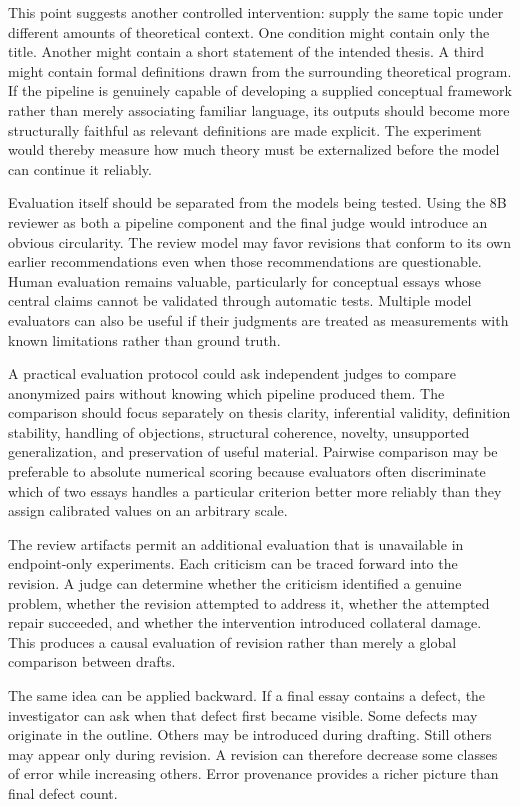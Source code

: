 \documentclass[11pt]{article}
\begin{document}
This point suggests another controlled intervention: supply the same topic under different amounts of theoretical context. One condition might contain only the title. Another might contain a short statement of the intended thesis. A third might contain formal definitions drawn from the surrounding theoretical program. If the pipeline is genuinely capable of developing a supplied conceptual framework rather than merely associating familiar language, its outputs should become more structurally faithful as relevant definitions are made explicit. The experiment would thereby measure how much theory must be externalized before the model can continue it reliably.

Evaluation itself should be separated from the models being tested. Using the 8B reviewer as both a pipeline component and the final judge would introduce an obvious circularity. The review model may favor revisions that conform to its own earlier recommendations even when those recommendations are questionable. Human evaluation remains valuable, particularly for conceptual essays whose central claims cannot be validated through automatic tests. Multiple model evaluators can also be useful if their judgments are treated as measurements with known limitations rather than ground truth.

A practical evaluation protocol could ask independent judges to compare anonymized pairs without knowing which pipeline produced them. The comparison should focus separately on thesis clarity, inferential validity, definition stability, handling of objections, structural coherence, novelty, unsupported generalization, and preservation of useful material. Pairwise comparison may be preferable to absolute numerical scoring because evaluators often discriminate which of two essays handles a particular criterion better more reliably than they assign calibrated values on an arbitrary scale.

The review artifacts permit an additional evaluation that is unavailable in endpoint-only experiments. Each criticism can be traced forward into the revision. A judge can determine whether the criticism identified a genuine problem, whether the revision attempted to address it, whether the attempted repair succeeded, and whether the intervention introduced collateral damage. This produces a causal evaluation of revision rather than merely a global comparison between drafts.

The same idea can be applied backward. If a final essay contains a defect, the investigator can ask when that defect first became visible. Some defects may originate in the outline. Others may be introduced during drafting. Still others may appear only during revision. A revision can therefore decrease some classes of error while increasing others. Error provenance provides a richer picture than final defect count.
\end{document}
